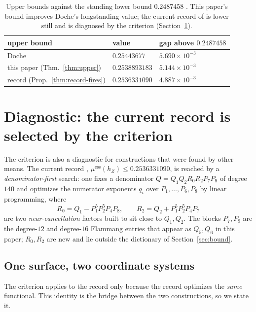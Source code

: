 \documentclass[11pt,reqno]{amsart}
\theoremstyle{plain}
\theoremstyle{definition}
\theoremstyle{remark}
\newcommand{\hZ}{h_Z}
\newcommand{\essmin}{\mu^{\mathrm{ess}}(\hZ)}
\begin{document}
\begin{table}[ht]
\centering\small
\renewcommand{\arraystretch}{1.2}
\begin{tabular}{@{}lll@{}}
\toprule
upper bound & value & gap above $0.2487458$ \citep{F18}\\
\midrule
Doche \citep{Doc01b} & $0.25443677$ & $5.690\times10^{-3}$\\
this paper (Thm.~\ref{thm:upper}) & $0.2538893183$ & $5.144\times10^{-3}$\\
record \citep{Gri26} (Prop.~\ref{thm:record-fires}) & $0.2536331090$ & $4.887\times10^{-3}$\\
\bottomrule
\end{tabular}
\medskip
\caption{Upper bounds against the standing lower bound $0.2487458$ \citep{F18}. This
paper's bound improves Doche's longstanding value; the current record of \citet{Gri26}
is lower still and is diagnosed by the criterion (Section~\ref{sec:record}).}
\label{tab:gap}
\end{table}

\section{Diagnostic: the current record is selected by the criterion}\label{sec:record}

The criterion is also a diagnostic for constructions that were found by other means. The current record \citep{Gri26},
$\essmin\le0.2536331090$, is reached by a \emph{denominator-first} search: one fixes a
denominator $Q=Q_1Q_2R_0R_2P_7P_9$ of degree $140$ and optimizes the numerator
exponents $q_i$ over $P_1,\dots,P_6,P_8$ by linear programming, where
\begin{equation}\label{eq:R0R2}
  R_0=Q_1-P_1^5P_2^5P_4P_8,\qquad R_2=Q_2+P_1^5P_2^5P_4P_7
\end{equation}
are two \emph{near-cancellation} factors built to sit close to $Q_1,Q_2$. The blocks
$P_7,P_9$ are the degree-$12$ and degree-$16$ Flammang entries that appear as $Q_5,Q_6$
in this paper; $R_0,R_2$ are new and lie outside the dictionary of
Section~\ref{sec:bound}.

\subsection*{One surface, two coordinate systems}
The criterion applies to the record only because the record optimizes the \emph{same}
functional. This identity is the bridge between the two constructions, so we state it.
\end{document}

